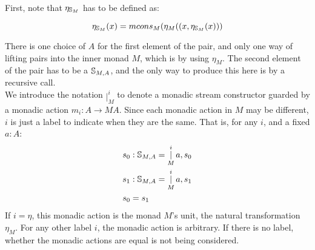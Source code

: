 \documentclass{article}
\begin{document}
First, note that $\eta_{\mathbb{S}_{M}}$ has to be defined as:

$$\eta_{\mathbb{S}_{M}}(x) = mcons_M(\eta_M ((x, \eta_{\mathbb{S}_{M}}(x)))$$ 

There is one choice of $A$ for the first element of the pair, and only one way of lifting pairs into the inner monad $M$, which is by using $\eta_M$. The second element of the pair has to be a $\mathbb{S}_{M,A}$, and the only way to produce this here is by a recursive call.\\

We introduce the notation $\mathop{|}_M^i$ to denote a monadic stream constructor guarded by a monadic action $m_i : A \to MA$. Since each monadic action in $M$ may be different, $i$ is just a label to indicate when they are the same. That is, for any $i$, and a fixed $a : A$:
\begin{align*}
&s_0 : \mathbb{S}_{M,A} = \mathop{|}_M^i a, s_0\\
&s_1 : \mathbb{S}_{M,A} = \mathop{|}_M^i a, s_1\\
&s_0 = s_1
\end{align*}
If $i = \eta$, this monadic action is the monad $M$'s unit, the natural transformation $\eta_M$. For any other label $i$, the monadic action is arbitrary. If there is no label, whether the monadic actions are equal is not being considered.\\
\end{document}
